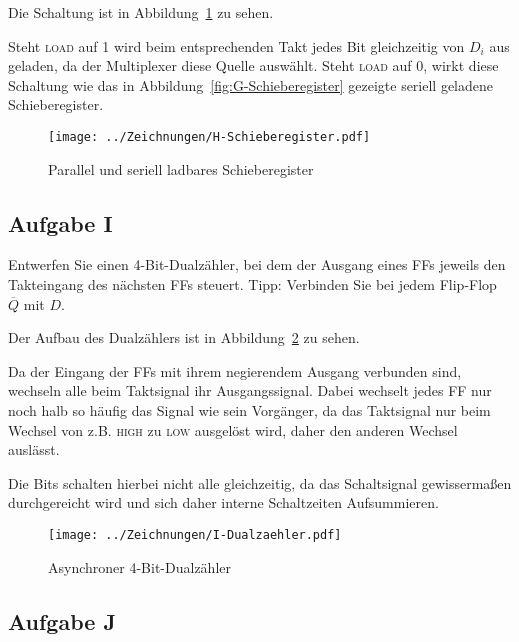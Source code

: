 Die Schaltung ist in Abbildung~\ref{fig:H-Schieberegister} zu sehen.

Steht \textsc{load} auf 1 wird beim entsprechenden Takt jedes Bit gleichzeitig
von $D_i$ aus geladen, da der Multiplexer diese Quelle auswählt. Steht
\textsc{load} auf 0, wirkt diese Schaltung wie das in
Abbildung~\ref{fig:G-Schieberegister} gezeigte seriell geladene Schieberegister.

\begin{figure}
    \centering
    \texttt{[image: ../Zeichnungen/H-Schieberegister.pdf]}
    \caption{%
        Parallel und seriell ladbares Schieberegister
    }
    \label{fig:H-Schieberegister}
\end{figure}

\FloatBarrier
\subsection{Aufgabe I}

\begin{problem}
    Entwerfen Sie einen 4-Bit-Dualzähler, bei dem der Ausgang eines FFs jeweils
    den Takteingang des nächsten FFs steuert. Tipp: Verbinden Sie bei jedem
    Flip-Flop $\overline Q$ mit $D$.
\end{problem}

Der Aufbau des Dualzählers ist in Abbildung~\ref{fig:I-Dualzähler} zu sehen.

Da der Eingang der FFs mit ihrem negierendem Ausgang verbunden sind, wechseln
alle beim Taktsignal ihr Ausgangssignal. Dabei wechselt jedes FF nur noch halb
so häufig das Signal wie sein Vorgänger, da das Taktsignal nur beim Wechsel von
z.B. \textsc{high} zu \textsc{low} ausgelöst wird, daher den anderen Wechsel
auslässt.

Die Bits schalten hierbei nicht alle gleichzeitig, da das Schaltsignal
gewissermaßen durchgereicht wird und sich daher interne Schaltzeiten
Aufsummieren.

\begin{figure}
    \centering
    \texttt{[image: ../Zeichnungen/I-Dualzaehler.pdf]}
    \caption{%
        Asynchroner 4-Bit-Dualzähler
    }
    \label{fig:I-Dualzähler}
\end{figure}

\FloatBarrier
\subsection{Aufgabe J}

